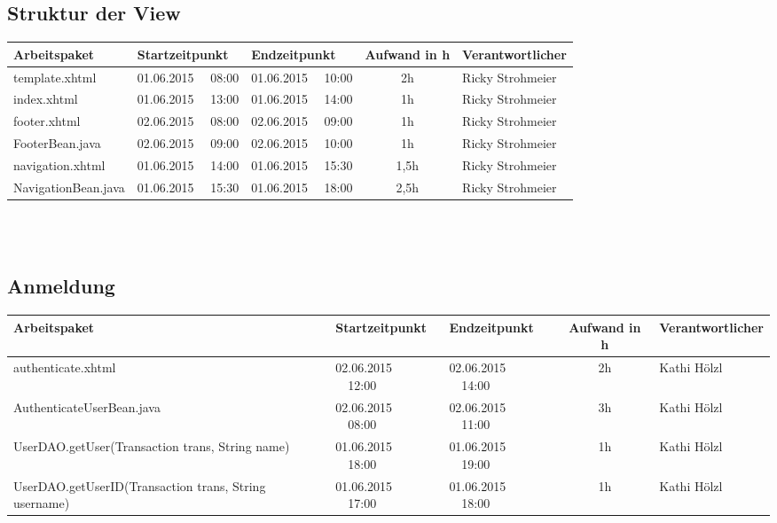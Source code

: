 \begin{landscape}
\subsection{Struktur der View}
\begin{tabular}{|p{10cm}|p{3.2cm}|p{3.2cm}|c|p{3.5cm}|}
	\hline  \textbf{Arbeitspaket} & \textbf{Startzeitpunkt} & \textbf{Endzeitpunkt} & \textbf{Aufwand in h} & \textbf{Verantwortlicher} \\ 
	\hline   template.xhtml                   & 01.06.2015 \ \ 08:00     & 01.06.2015 \ \ 10:00     &      2h               & Ricky Strohmeier\\
	\hline   index.xhtml                      & 01.06.2015 \ \ 13:00     & 01.06.2015 \ \ 14:00     &      1h               & Ricky Strohmeier\\
	\hline   footer.xhtml                     & 02.06.2015 \ \ 08:00     & 02.06.2015 \ \ 09:00     &      1h               & Ricky Strohmeier\\ 
	\hline   FooterBean.java                  & 02.06.2015 \ \ 09:00     & 02.06.2015 \ \ 10:00     &      1h               & Ricky Strohmeier\\ 
	\hline   navigation.xhtml                 & 01.06.2015 \ \ 14:00     & 01.06.2015 \ \ 15:30     &      1,5h             & Ricky Strohmeier\\ 
	\hline   NavigationBean.java              & 01.06.2015 \ \ 15:30     & 01.06.2015 \ \ 18:00     &      2,5h             & Ricky Strohmeier\\ 
	\hline 
\end{tabular} \ \\
\ \\

\subsection{Anmeldung}
\begin{tabular}{|p{10.3cm}|p{3.2cm}|p{3.2cm}|c|p{3.5cm}|}
	\hline  \textbf{Arbeitspaket} & \textbf{Startzeitpunkt} & \textbf{Endzeitpunkt} & \textbf{Aufwand in h} & \textbf{Verantwortlicher} \\ 
	\hline   authenticate.xhtml                                   & 02.06.2015 \ \ 12:00     & 02.06.2015 \ \ 14:00     &      2h               & Kathi Hölzl\\
	\hline   AuthenticateUserBean.java                            & 02.06.2015 \ \ 08:00     & 02.06.2015 \ \ 11:00     &      3h               & Kathi Hölzl\\
	\hline   UserDAO.getUser(Transaction trans, String name)      & 01.06.2015 \ \ 18:00     & 01.06.2015 \ \ 19:00     &      1h               & Kathi Hölzl\\
	\hline   UserDAO.getUserID(Transaction trans, String username)& 01.06.2015 \ \ 17:00     & 01.06.2015 \ \ 18:00     &      1h               & Kathi Hölzl\\
	\hline 
\end{tabular} \ \\
\ \\


\end{landscape}
